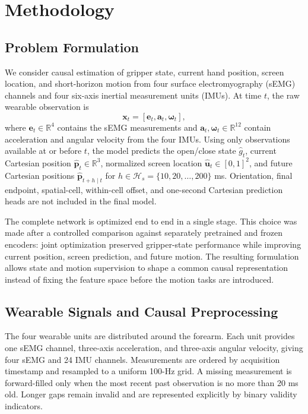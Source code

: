 
\section{Methodology}
\label{sec:methodology}

\subsection{Problem Formulation}

We consider causal estimation of gripper state, current hand position, screen
location, and short-horizon motion from four surface electromyography (sEMG)
channels and four six-axis inertial measurement units (IMUs). At time $t$, the
raw wearable observation is
\begin{equation}
    \mathbf{x}_t=[\mathbf{e}_t,\mathbf{a}_t,\boldsymbol{\omega}_t],
\end{equation}
where $\mathbf{e}_t\in\mathbb{R}^{4}$ contains the sEMG measurements and
$\mathbf{a}_t,\boldsymbol{\omega}_t\in\mathbb{R}^{12}$ contain acceleration and
angular velocity from the four IMUs. Using only observations available at or
before $t$, the model predicts the open/close state $\hat g_t$, current
Cartesian position $\hat{\mathbf p}_t\in\mathbb{R}^{3}$, normalized screen
location $\hat{\mathbf u}_t\in[0,1]^2$, and future Cartesian positions
$\hat{\mathbf p}_{t+h\mid t}$ for
$h\in\mathcal H_s=\{10,20,\ldots,200\}$ ms. Orientation, final endpoint,
spatial-cell, within-cell offset, and one-second Cartesian prediction heads are
not included in the final model.

The complete network is optimized end to end in a single stage. This choice was
made after a controlled comparison against separately pretrained and frozen
encoders: joint optimization preserved gripper-state performance while
improving current position, screen prediction, and future motion. The resulting
formulation allows state and motion supervision to shape a common causal
representation instead of fixing the feature space before the motion tasks are
introduced.

\subsection{Wearable Signals and Causal Preprocessing}
\label{subsec:preprocessing}

The four wearable units are distributed around the forearm. Each unit provides
one sEMG channel, three-axis acceleration, and three-axis angular velocity,
giving four sEMG and 24 IMU channels. Measurements are ordered by acquisition
timestamp and resampled to a uniform 100-Hz grid. A missing measurement is
forward-filled only when the most recent past observation is no more than
20 ms old. Longer gaps remain invalid and are represented explicitly by binary
validity indicators.

